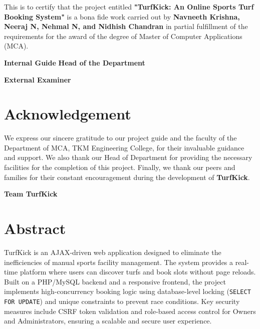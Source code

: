 \documentclass[12pt,a4paper]{report}
\begin{document}
\begin{flushleft}
This is to certify that the project entitled \textbf{"TurfKick: An Online Sports Turf Booking System"} is a bona fide work carried out by \textbf{Navneeth Krishna, Neeraj N, Nehmal N, and Nidhish Chandran} in partial fulfillment of the requirements for the award of the degree of Master of Computer Applications (MCA).
\end{flushleft}

\vspace{1in}
\noindent \textbf{Internal Guide} \hfill \textbf{Head of the Department}
\vspace{0.5in}
\begin{flushleft}
\textbf{External Examiner}
\end{flushleft}

\chapter*{Acknowledgement}
We express our sincere gratitude to our project guide and the faculty of the Department of MCA, TKM Engineering College, for their invaluable guidance and support. We also thank our Head of Department for providing the necessary facilities for the completion of this project. Finally, we thank our peers and families for their constant encouragement during the development of \textbf{TurfKick}.

\vspace{0.5in}
\noindent \textbf{Team TurfKick}

\chapter*{Abstract}
TurfKick is an AJAX-driven web application designed to eliminate the inefficiencies of manual sports facility management. The system provides a real-time platform where users can discover turfs and book slots without page reloads. Built on a PHP/MySQL backend and a responsive frontend, the project implements high-concurrency booking logic using database-level locking (\texttt{SELECT FOR UPDATE}) and unique constraints to prevent race conditions. Key security measures include CSRF token validation and role-based access control for Owners and Administrators, ensuring a scalable and secure user experience.
\end{document}
